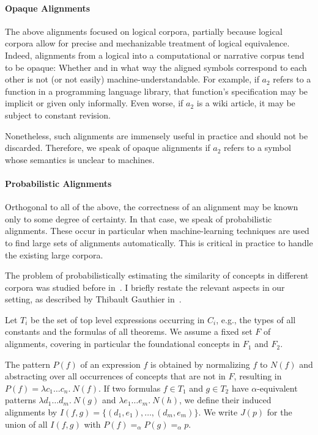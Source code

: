 \paragraph{Opaque Alignments}
The above alignments focused on logical corpora, partially because logical corpora allow for precise and mechanizable treatment of logical equivalence.
Indeed, alignments from a logical into a computational or narrative corpus tend to be opaque: Whether and in what way the aligned symbols correspond to each other is not (or not easily) machine-understandable.
For example, if $a_2$ refers to a function in a programming language library, that function's specification may be implicit or given only informally.
Even worse, if $a_2$ is a wiki article, it may be subject to constant revision.

Nonetheless, such alignments are immensely useful in practice and should not be discarded.
Therefore, we speak of opaque alignments if $a_2$ refers to a symbol whose semantics is unclear to machines.

\paragraph{Probabilistic Alignments}
Orthogonal to all of the above, the correctness of an alignment may be known only to some degree of certainty.
In that case, we speak of probabilistic alignments.
These occur in particular when machine-learning techniques are used to find large sets of alignments automatically.
This is critical in practice to handle the existing large corpora.

The problem of probabilistically estimating the similarity of concepts in different corpora was studied before in~\cite{tgck-cicm14}.
I briefly restate the relevant aspects in our setting, as described by Thibault Gauthier in~\cite{MueGauKal:cacfms17}.

Let $T_i$ be the set of top level expressions occurring in $C_i$, e.g., the types of all constants and the formulas of all theorems.
We assume a fixed set $F$ of alignments, covering in particular the foundational concepts in $F_1$ and $F_2$.

\begin{definition}
The pattern $P(f)$ of an expression $f$ is obtained by normalizing $f$ to $N(f)$ and abstracting over all occurrences of concepts that are not in $F$, resulting in $P(f) = \lambda c_1 \ldots c_n.\ N(f)$.
If two formulas $f\in T_1$ and $g\in T_2$ have $\alpha$-equivalent patterns 
$\lambda d_1 \ldots d_m.\ N(g)$ and $\lambda e_1 \ldots e_m.\ N(h)$, we 
define their induced alignments by
 $I(f,g) = \{(d_1,e_1),\ldots,(d_m,e_m)\}$.
We write $J(p)$ for the union of all $I(f,g)$ with $P(f) =_\alpha P(g) =_\alpha p$.
\end{definition}

